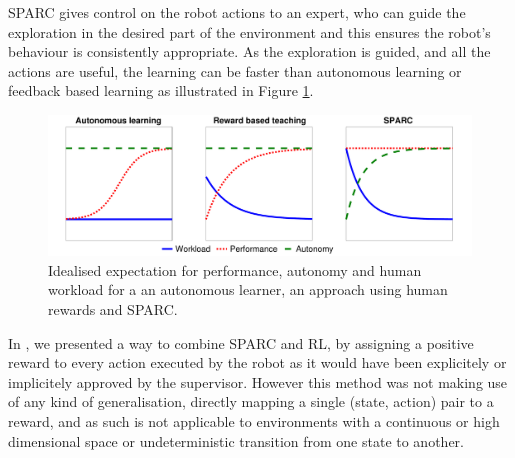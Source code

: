 \documentclass[letterpaper]{article} %
\begin{document}
SPARC gives control on the robot actions to an expert, who can guide the
exploration in the desired part of the environment and this ensures the robot's
behaviour is consistently appropriate. As the exploration is
guided, and all the actions are useful, the learning can be faster than
autonomous learning or feedback based learning as illustrated in Figure
\ref{fig:comparison}.

\begin{figure}
    \centering
    \includegraphics[width=0.9\linewidth]{./fig/motivation.pdf}
    \caption{Idealised expectation for performance, autonomy and human workload for a
    an autonomous learner, an approach using human rewards and SPARC.}
    \label{fig:comparison}
\end{figure}


In \cite{senft2017supervised}, we presented a way to combine SPARC and RL, by
assigning a positive reward to every action executed by the robot as it would
have been explicitely or implicitely approved by the supervisor. However this method
was not making use of any kind of generalisation, directly mapping a
single (state, action) pair to a reward, and as such is not applicable to
environments with a continuous or high dimensional space or undeterministic
transition from one state to another.
\end{document}
